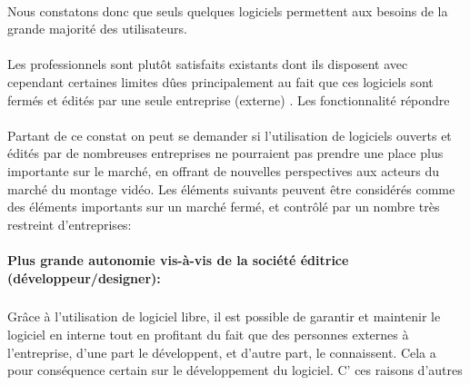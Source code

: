 \paragraph { }

Nous constatons donc que%
seuls quelques logiciels permettent %
aux besoins de la grande majorité des utilisateurs.

\paragraph{}

Les professionnels sont plutôt satisfaits %
existants dont ils disposent avec cependant certaines limites dûes
principalement au fait que ces logiciels sont fermés et édités par
une seule entreprise (externe) . Les fonctionnalité %
répondre %

\paragraph{}

Partant de ce constat on peut se demander si l'utilisation de logiciels
ouverts et édités par de nombreuses entreprises ne pourraient pas
prendre une place plus importante sur le marché, en offrant de nouvelles
perspectives aux acteurs du marché du montage vidéo. Les éléments
suivants peuvent être considérés comme des éléments importants sur un
marché fermé, et contrôlé par un nombre très restreint d'entreprises:

\paragraph{Plus grande autonomie vis-à-vis de la société éditrice
(développeur/designer):}

  \subparagraph{ }

    Grâce à l'utilisation de logiciel libre, il est possible de garantir
    et maintenir le logiciel en interne tout en profitant du fait que
    des personnes externes à l'entreprise, d'une part le développent,
    et d'autre part, le connaissent. Cela a pour conséquence %
    certain sur le développement du logiciel. C'%
   ces raisons %
    d'autres %

